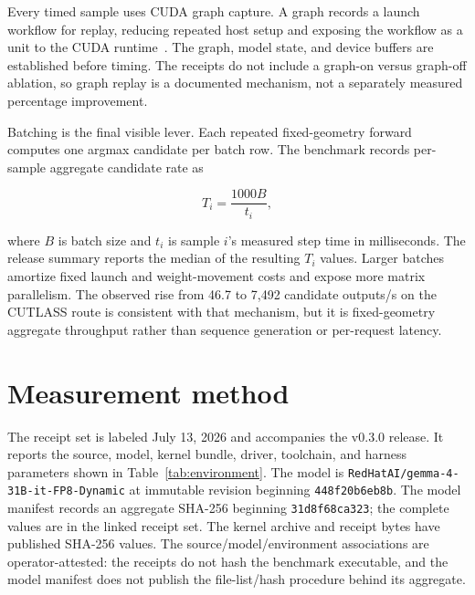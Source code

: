 Every timed sample uses CUDA graph capture. A graph records a launch workflow
for replay, reducing repeated host setup and exposing the workflow as a unit to
the CUDA runtime~\citep{nvidia2026cudagraphs}. The graph, model state, and
device buffers are established before timing. The receipts do not include a
graph-on versus graph-off ablation, so graph replay is a documented mechanism,
not a separately measured percentage improvement.

Batching is the final visible lever. Each repeated fixed-geometry forward computes
one argmax candidate per batch row. The benchmark records per-sample aggregate
candidate rate as

\begin{equation}
  T_i = \frac{1000B}{t_i},
\end{equation}

where $B$ is batch size and $t_i$ is sample $i$'s measured step time in
milliseconds. The release summary reports the median of the resulting $T_i$
values. Larger batches amortize fixed launch and weight-movement costs and
expose more matrix parallelism. The observed rise from 46.7 to 7,492 candidate
outputs/s on the CUTLASS route is consistent with that mechanism, but it is
fixed-geometry aggregate throughput rather than sequence generation or per-request
latency.

\section{Measurement method}

The receipt set is labeled July 13, 2026 and accompanies the v0.3.0 release.
It reports the source, model, kernel bundle, driver, toolchain, and harness
parameters shown in Table~\ref{tab:environment}. The model is
\texttt{RedHatAI/gemma-4-31B-it-FP8-Dynamic} at immutable revision beginning
\texttt{448f20b6eb8b}. The model manifest records an aggregate SHA-256 beginning
\texttt{31d8f68ca323}; the complete values are in the linked receipt set. The
kernel archive and receipt bytes have published SHA-256 values. The
source/model/environment associations are operator-attested: the receipts do
not hash the benchmark executable, and the model manifest does not publish the
file-list/hash procedure behind its aggregate.

